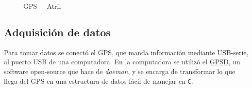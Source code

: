 \documentclass[spanish,12pt,a4paper,titlepage]{report}
\begin{document}
\begin{figure} [h!]
  \centering
  \caption{GPS + Atril}
  \label{fig:rebotes}
\end{figure}

\newpage
\subsection{Adquisición de datos}
\label{sec:adquisicion-de-datos}

Para tomar datos se conectó el GPS, que manda información mediante USB-serie, al puerto USB de una computadora. En la computadora se utilizó el \href{http://catb.org/gpsd/}{GPSD}, un software open-source que hace de \textit{daemon}, y se encarga de transformar lo que llega del GPS en una estructura de datos fácil de manejar en \verb+C+.
\end{document}
